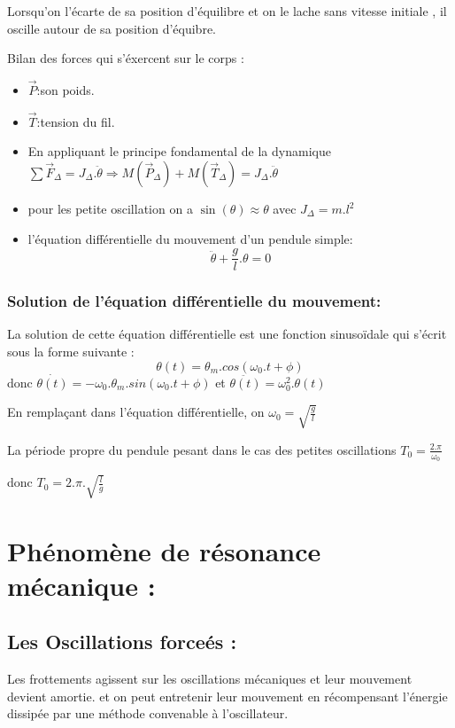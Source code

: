 \documentclass[12pt]{article}
\begin{document}
Lorsqu'on l'écarte de sa position d'équilibre et on le lache sans vitesse initiale , il oscille autour de sa position d'équibre. 

Bilan des forces qui s'éxercent sur le corps :
\begin{itemize}
	\item $\vec{P}$:son poids.
	\item $\vec{T}$:tension du fil.
	\item En appliquant le principe fondamental de la dynamique  $\sum{\vec{F}_{\Delta}} = J_{\Delta}.\ddot{\theta} \Rightarrow M(\vec{P}_{\Delta}) + M(\vec{T}_{\Delta}) = J_{\Delta}.\ddot{\theta}$

	\item pour les petite oscillation on a $\sin(\theta) \approx \theta$ avec $J_{\Delta} = m.l^2$
	\item l'équation différentielle du mouvement d'un pendule simple: $$\ddot{\theta} + \frac{g}{l}.\theta = 0$$ 

\end{itemize}

\subsubsection{Solution de l'équation différentielle du mouvement: }
La solution de cette équation différentielle est une fonction sinusoïdale qui s'écrit sous la forme suivante : $$\theta(t) = \theta_m.cos(\omega_0.t + \phi)$$
donc $\dot{ \theta(t) }= -\omega_0.\theta_m.sin(\omega_0.t + \phi)$ et $\ddot{\theta(t)} = \omega_0^2.\theta(t)$

En remplaçant dans l'équation différentielle, on $\omega_0 = \sqrt{\frac{g}{l}}$

La période propre du pendule pesant dans le cas des petites oscillations $T_0 = \frac{2.\pi}{\omega_0}$

donc $T_0 = 2.\pi.\sqrt{\frac{l}{g}}$

\section{Phénomène de résonance mécanique :  }
\subsection{Les Oscillations forceés :}
Les frottements agissent sur les oscillations mécaniques et leur mouvement devient amortie. et on peut entretenir leur
mouvement en récompensant l'énergie dissipée par une méthode convenable à l'oscillateur.
\end{document}
